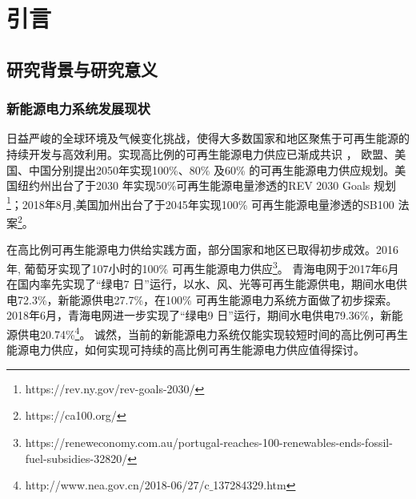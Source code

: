  \chapter{引言}
\label{cha:intro}

\section{研究背景与研究意义}
\label{sec:background}
\subsection{新能源电力系统发展现状}
日益严峻的全球环境及气候变化挑战，使得大多数国家和地区聚焦于可再生能源的持续开发与高效利用。实现高比例的可再生能源电力供应已渐成共识
\cite{Obama-Science-17,Balance-Nature16,Chu-Nature-12}， 欧盟、美国、中国分别提出2050年实现100\%、80\% 及60\% 的可再生能源电力供应规划\cite{PS-Flexibility-Plan-LZX-16}。美国纽约州出台了于2030 年实现50\%可再生能源电量渗透的REV 2030 Goals 规划
\footnote{https://rev.ny.gov/rev-goals-2030/}；2018年8月,美国加州出台了于2045年实现100\% 可再生能源电量渗透的SB100 法案\footnote{https://ca100.org/}。

在高比例可再生能源电力供给实践方面，部分国家和地区已取得初步成效。2016年, 葡萄牙实现了107小时的100\% 可再生能源电力供应\footnote{https://reneweconomy.com.au/portugal-reaches-100-renewables-ends-fossil-fuel-subsidies-32820/}。 青海电网于2017年6月在国内率先实现了“绿电7 日”运行，以水、风、光等可再生能源供电，期间水电供电72.3\%，新能源供电27.7\%，在100\% 可再生能源电力系统方面做了初步探索。2018年6月，青海电网进一步实现了“绿电9 日”运行，期间水电供电79.36\%，新能源供电20.74\%\footnote{http://www.nea.gov.cn/2018-06/27/c$\_$137284329.htm}。 诚然，当前的新能源电力系统仅能实现较短时间的高比例可再生能源电力供应，如何实现可持续的高比例可再生能源电力供应值得探讨。

